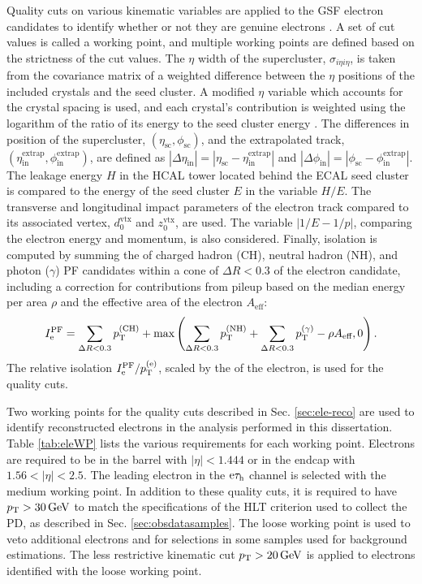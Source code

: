 \documentclass[12pt]{thesis}  %
\newcommand{\tauh}{\ensuremath{\tau_{\text{h}}}\xspace}
\newcommand{\Pe}{\ensuremath{\cmsSymbolFace{e}}\xspace}
\newcommand{\etau}{\ensuremath{\Pe\tauh}\xspace}
\begin{document}
Quality cuts on various kinematic variables are applied to the GSF electron candidates to identify whether or not they are genuine electrons \cite{ElectronCutBased}. A set of cut values is called a working point, and multiple working points are defined based on the strictness of the cut values. The $\eta$ width of the supercluster, $\sigma_{i\eta i\eta}$, is taken from the covariance matrix of a weighted difference between the $\eta$ positions of the included crystals and the seed cluster. A modified $\eta$ variable which accounts for the crystal spacing is used, and each crystal's contribution is weighted using the logarithm of the ratio of its energy to the seed cluster energy \cite{EgammaShowerShape}. The differences in position of the supercluster, $(\eta_{\text{sc}},\phi_{\text{sc}})$, and the extrapolated track, $(\eta_{\text{in}}^{\text{extrap}},\phi_{\text{in}}^{\text{extrap}})$, are defined as $|\Delta \eta_{\text{in}}| = |\eta_{\text{sc}} - \eta_{\text{in}}^{\text{extrap}}|$ and $|\Delta \phi_{\text{in}}| = |\phi_{\text{sc}} - \phi_{\text{in}}^{\text{extrap}}|$. The leakage energy $H$ in the HCAL tower located behind the ECAL seed cluster is compared to the energy of the seed cluster $E$ in the variable $H/E$. The transverse and longitudinal impact parameters of the electron track compared to its associated vertex, $d_{0}^{\text{vtx}}$ and $z_{0}^{\text{vtx}}$, are used. The variable $|1/E - 1/p|$, comparing the electron energy and momentum, is also considered. Finally, isolation is computed by summing the \pt of charged hadron (CH), neutral hadron (NH), and photon ($\gamma$) PF candidates within a cone of $\Delta R < 0.3$ of the electron candidate, including a correction for contributions from pileup based on the median energy per area $\rho$ and the effective area of the electron $A_{\text{eff}}$:
\begin{equation}
I^{\text{PF}}_{\Pe} = \sum_{\Delta R < 0.3}{\pt^{(\text{CH})}} + \text{max}\left( \sum_{\Delta R < 0.3}{\pt^{(\text{NH})}} + \sum_{\Delta R < 0.3}{\pt^{(\gamma)}} - \rho A_{\text{eff}}, 0 \right).
\end{equation}
The relative isolation $I^{\text{PF}}_{\Pe}/\pt^{(\Pe)}$, scaled by the \pt of the electron, is used for the quality cuts.

Two working points for the quality cuts described in Sec. \ref{sec:ele-reco} are used to identify reconstructed electrons in the analysis performed in this dissertation. Table \ref{tab:eleWP} lists the various requirements for each working point. Electrons are required to be in the barrel with $|\eta|<1.444$ or in the endcap with $1.56<|\eta|<2.5$. The leading electron in the \etau channel is selected with the medium working point. In addition to these quality cuts, it is required to have $p_{\mathrm{T}}>30\,\text{Ge\hspace{-.08em}V}$ to match the specifications of the HLT criterion used to collect the PD, as described in Sec. \ref{sec:obsdatasamples}. The loose working point is used to veto additional electrons and for selections in some samples used for background estimations. The less restrictive kinematic cut $p_{\mathrm{T}}>20\,\text{Ge\hspace{-.08em}V}$ is applied to electrons identified with the loose working point.
\end{document}
